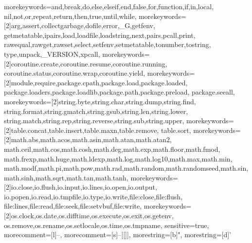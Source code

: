 
  {morekeywords={and,break,do,else,elseif,end,false,for,function,if,in,local,
     nil,not,or,repeat,return,then,true,until,while},
   morekeywords={[2]arg,assert,collectgarbage,dofile,error,_G,getfenv,
     getmetatable,ipairs,load,loadfile,loadstring,next,pairs,pcall,print,
     rawequal,rawget,rawset,select,setfenv,setmetatable,tonumber,tostring,
     type,unpack,_VERSION,xpcall},
   morekeywords={[2]coroutine.create,coroutine.resume,coroutine.running,
     coroutine.status,coroutine.wrap,coroutine.yield},
   morekeywords={[2]module,require,package.cpath,package.load,package.loaded,
     package.loaders,package.loadlib,package.path,package.preload,
     package.seeall},
   morekeywords={[2]string.byte,string.char,string.dump,string.find,
     string.format,string.gmatch,string.gsub,string.len,string.lower,
     string.match,string.rep,string.reverse,string.sub,string.upper},
   morekeywords={[2]table.concat,table.insert,table.maxn,table.remove,
   table.sort},
   morekeywords={[2]math.abs,math.acos,math.asin,math.atan,math.atan2,
     math.ceil,math.cos,math.cosh,math.deg,math.exp,math.floor,math.fmod,
     math.frexp,math.huge,math.ldexp,math.log,math.log10,math.max,math.min,
     math.modf,math.pi,math.pow,math.rad,math.random,math.randomseed,math.sin,
     math.sinh,math.sqrt,math.tan,math.tanh},
   morekeywords={[2]io.close,io.flush,io.input,io.lines,io.open,io.output,
     io.popen,io.read,io.tmpfile,io.type,io.write,file:close,file:flush,
     file:lines,file:read,file:seek,file:setvbuf,file:write},
   morekeywords={[2]os.clock,os.date,os.difftime,os.execute,os.exit,os.getenv,
     os.remove,os.rename,os.setlocale,os.time,os.tmpname},
   sensitive=true,
   morecomment=[l]{--},
   morecomment=[s]{--[[}{]]},
   morestring=[b]",
   morestring=[d]'
  }
